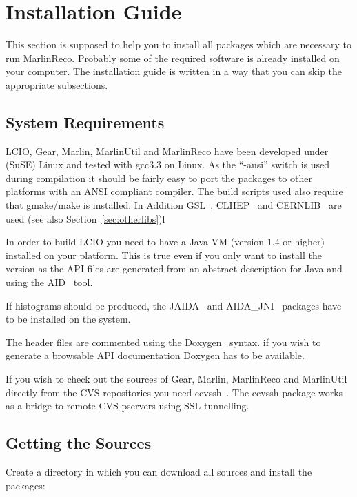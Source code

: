 \section{Installation Guide} \label{sec:install}

This section is supposed to help you to install all packages which are 
necessary to run MarlinReco. Probably some of the required software is 
already installed on your computer. The installation guide is written 
in a way that you can skip the appropriate subsections. 

\subsection{System Requirements}

LCIO, Gear, Marlin, MarlinUtil and MarlinReco have been 
developed under (SuSE) Linux and tested with gcc3.3 on Linux. 
As the ``-ansi'' switch is used during compilation
it should be fairly easy to 
port the packages to other platforms with an ANSI compliant \CPP{} compiler.
The build scripts used also require that gmake/make is installed.
In Addition GSL~\cite{ref_gsl}, CLHEP~\cite{ref_clhep} and 
CERNLIB~\cite{ref_cernlib} are used (see also Section~\ref{sec:otherlibs})l

In order to build LCIO you need to have a Java VM (version 1.4 or
higher) installed on your platform. This is true even if you only want
to install the \CPP{} version as the API-files are generated from an
abstract description for Java and \CPP{} using the AID~\cite{ref_aid} tool.

If histograms should be produced, the JAIDA~\cite{ref_jaida} and 
AIDA\_JNI~\cite{ref_aidajni} packages have 
to be installed on the system. 

The header files are commented using the Doxygen~\cite{ref_doxygen} syntax. 
if you wish to generate a browsable API documentation Doxygen 
has to be available.

If you wish to check out the sources of Gear, Marlin, MarlinReco
and MarlinUtil directly from the CVS repositories you need
ccvssh~\cite{ref_ccvssh}.
The ccvssh package works as a bridge to remote CVS
pservers using SSL tunnelling.  

\subsection{Getting the Sources}

Create a directory in which you can download all sources and install 
the packages:

